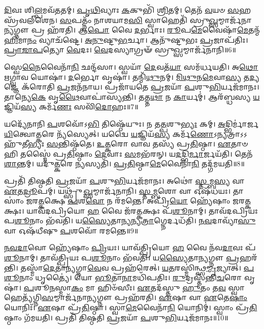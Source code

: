 \-\ul{𑌦𑌿}\-𑌵𑌃 𑌶𑌿\-\ul{𑌲𑍍𑌪}\-𑌮𑌵᳴𑌤𑌤𑌮𑍍।
\-\ul{𑌪𑍃}\-\-\ul{𑌥𑌿}\-𑌵𑍍𑌯𑌾𑌃 \ul{𑌕}\-𑌕𑍁𑌭𑌿᳴ \ul{𑌶𑍍𑌰𑌿}\-𑌤𑌮𑍍।
𑌤𑍇𑌨᳴ \ul{𑌵}\-𑌯𑍞 \ul{𑌸}\-𑌹𑌸𑍍𑌰᳴𑌵𑌲𑍍‌𑌶𑍇𑌨।
\-\ul{𑌸}\-𑌪𑌤𑍍𑌨𑌂᳴ 𑌨𑌾𑌶𑌯𑌾𑌮\-\ul{𑌸𑌿} 𑌸𑍍𑌵𑌾𑌹𑍇𑌤𑌿᳴ 𑌸𑍍𑌰𑍁\-\ul{𑌖𑍍𑌸}\-𑌮𑍍𑌮𑌾𑌰𑍍𑌜᳴𑌨𑌾\-\ul{𑌨𑍍𑌯}\-𑌗𑍍𑌨𑍗 𑌪𑍍𑌰 𑌹᳴𑌰𑌤𑌿।
𑌆\-\ul{𑌪𑍋} 𑌵𑍈 \ul{𑌦}\-𑌰𑍍𑌭𑌾𑌃।
\-\ul{𑌰𑍂}\-𑌪\-\ul{𑌮𑍇}\-𑌵𑍈𑌷𑌾᳴\-\ul{𑌮𑍇}\-𑌤𑌨𑍍𑌮᳴\-\ul{𑌹𑌿}\-𑌮𑌾\-\ul{𑌨𑌂} 𑌵𑍍𑌯𑌾𑌚᳴𑌷𑍍𑌟𑍇।
\-\ul{𑌅}\-\-\ul{𑌨𑍁}\-𑌷𑍍𑌟𑍁\-\ul{𑌭}\-𑌰𑍍𑌚𑌾।
𑌆𑌨𑍁᳴𑌷𑍍𑌟𑍁𑌭𑌃 \ul{𑌪𑍍𑌰}\-𑌜𑌾\-𑌪᳴𑌤𑌿𑌃।
\-\ul{𑌪𑍍𑌰𑌾}\-\-\ul{𑌜𑌾}\-\-\ul{𑌪}\-𑌤𑍍𑌯𑍋 \ul{𑌵𑍇}\-𑌦𑌃।
\-\ul{𑌵𑍇}\-𑌦𑌸𑍍𑌯𑌾𑌗𑍍𑌰𑍟᳴ 𑌸𑍍𑌰𑍁\-\ul{𑌖𑍍𑌸}\-𑌮𑍍𑌮𑌾𑌰𑍍𑌜᳴𑌨𑌾𑌨𑌿॥6॥

𑌸𑍍𑌵𑍇\-\ul{𑌨𑍈}\-𑌵𑍈𑌨𑌾᳴\-\ul{𑌨𑌿} 𑌛𑌨𑍍𑌦᳴𑌸𑌾।
𑌸𑍍𑌵𑌯𑌾᳴ \ul{𑌦𑍇}\-𑌵𑌤᳴\-\ul{𑌯𑌾} 𑌸𑌮᳴𑌰𑍍𑌧𑌯𑌤𑌿।
𑌅\-\ul{𑌥𑍋} 𑌋𑌗𑍍𑌵𑌾𑌵 𑌯𑍋𑌷𑌾॑।
\-\ul{𑌦}\-𑌰𑍍𑌭𑍋 𑌵𑍃𑌷𑌾॑।
𑌤𑌨𑍍𑌮𑌿᳴\-\ul{𑌥𑍁}\-𑌨𑌮𑍍।
\-\ul{𑌮𑌿}\-\-\ul{𑌥𑍁}\-𑌨\-\ul{𑌮𑍇}\-𑌵𑌾\-\ul{𑌸𑍍𑌯} 𑌤\-\ul{𑌦𑍍𑌯}\-𑌜𑍍𑌞𑍇 𑌕᳴𑌰𑍋𑌤𑌿 \ul{𑌪𑍍𑌰}\-𑌜𑌨᳴𑌨𑌾𑌯।
𑌪𑍍𑌰𑌜𑌾᳴𑌯𑌤𑍇 \ul{𑌪𑍍𑌰}\-𑌜𑌯𑌾᳴ \ul{𑌪}\-𑌶𑍁\-\ul{𑌭𑌿}\-𑌰𑍍𑌯𑌜᳴𑌮𑌾𑌨𑌃।
𑌤𑌾𑌨𑍍𑌯𑍇\-\ul{𑌕𑍇} 𑌵𑍃\-\ul{𑌥𑍈}\-𑌵𑌾𑌪𑌾॑𑌸𑍍𑌯𑌨𑍍𑌤𑌿।
𑌤𑌤𑍍𑌤\-\ul{𑌥𑌾} 𑌨 \ul{𑌕𑌾}\-𑌰𑍍𑌯𑌮𑍍॑।
𑌆𑌰᳴𑌬𑍍𑌧𑌸𑍍𑌯 \ul{𑌯}\-𑌜𑍍𑌞𑌿𑌯᳴\-\ul{𑌸𑍍𑌯} 𑌕𑌰𑍍𑌮᳴\-\ul{𑌣𑌃} 𑌸𑌵𑌿᳴\-\ul{𑌦𑍋}\-𑌹𑌃॥7॥

𑌯𑌦𑍍𑌯𑍇᳴𑌨𑌾𑌨𑌿 \ul{𑌪}\-𑌶𑌵𑍋᳴𑌽\-\ul{𑌭𑌿} 𑌤𑌿𑌷𑍍𑌠𑍇᳴𑌯𑍁𑌃।
𑌨 𑌤\-\ul{𑌤𑍍𑌪}\-𑌶𑍁\-\ul{𑌭𑍍𑌯𑌃} 𑌕𑌮𑍍।
\-\ul{𑌅}\-𑌦𑍍𑌭𑌿𑌰𑍍𑌮𑌾॑𑌰𑍍𑌜\-\ul{𑌯𑌿}\-𑌤𑍍𑌵𑍋\-\ul{𑌤𑍍𑌕}\-𑌰𑍇 𑌨𑍍𑌯᳴𑌸𑍍𑌯𑍇𑌤𑍍।
𑌯𑌦𑍍𑌵𑍈 \ul{𑌯}\-𑌜𑍍𑌞𑌿𑌯᳴\-\ul{𑌸𑍍𑌯} 𑌕𑌰𑍍𑌮᳴\-\ul{𑌣𑍋}\-\-𑌽𑌨𑍍𑌯𑌤𑍍𑌰𑌾𑌽𑌽𑌹𑍁᳴𑌤𑍀𑌭𑍍𑌯𑌃 \ul{𑌸}\-𑌨𑍍𑌤𑌿𑌷𑍍𑌠᳴𑌤𑍇।
\-\ul{𑌉}\-\-\ul{𑌤𑍍𑌕}\-𑌰𑍋 𑌵𑌾𑌵 𑌤𑌸𑍍𑌯᳴ 𑌪𑍍𑌰\-\ul{𑌤𑌿}\-𑌷𑍍𑌠𑌾।
\-\ul{𑌏}\-𑌤𑌾𑍞 𑌹𑌿 𑌤𑌸𑍍𑌮𑍈॑ 𑌪𑍍𑌰\-\ul{𑌤𑌿}\-𑌷𑍍𑌠𑌾𑌂 \ul{𑌦𑍇}\-𑌵𑌾𑌃 \ul{𑌸}\-𑌮𑌭᳴𑌰𑌨𑍍।
𑌯\-\ul{𑌦}\-𑌦𑍍𑌭𑌿\-\ul{𑌰𑍍𑌮𑌾}\-𑌰𑍍𑌜𑌯᳴𑌤𑌿।
𑌤𑍇𑌨᳴ \ul{𑌶𑌾}\-𑌨𑍍𑌤𑌮𑍍।
𑌯𑌦𑍁᳴\-\ul{𑌤𑍍𑌕}\-𑌰𑍇 \ul{𑌨𑍍𑌯}\-𑌸𑍍𑌯𑌤𑌿᳴।
\-\ul{𑌪𑍍𑌰}\-\-\ul{𑌤𑌿}\-𑌷𑍍𑌠𑌾\-\ul{𑌮𑍇}\-𑌵𑍈𑌨𑌾᳴\-\ul{𑌨𑌿} 𑌤𑌦𑍍𑌗᳴𑌮𑌯𑌤𑌿॥8॥

𑌪𑍍𑌰𑌤𑌿᳴ 𑌤𑌿𑌷𑍍𑌠𑌤𑌿 \ul{𑌪𑍍𑌰}\-𑌜𑌯𑌾᳴ \ul{𑌪}\-𑌶𑍁\-\ul{𑌭𑌿}\-𑌰𑍍𑌯𑌜᳴𑌮𑌾𑌨𑌃।
𑌅𑌥𑍋॑ \ul{𑌸𑍍𑌤}\-𑌮𑍍𑌬\-\ul{𑌸𑍍𑌯} 𑌵𑌾 \ul{𑌏}\-𑌤\-\ul{𑌦𑍍𑌰𑍂}\-𑌪𑌮𑍍।
𑌯𑌥𑍍𑌸𑍍𑌰𑍁᳴\-\ul{𑌖𑍍𑌸}\-𑌮𑍍𑌮𑌾𑌰𑍍𑌜᳴𑌨𑌾𑌨𑌿।
\-\ul{𑌸𑍍𑌤}\-\-\ul{𑌮𑍍𑌬}\-𑌶𑍋 𑌵𑌾 𑌓𑌷᳴𑌧𑌯𑌃।
𑌤𑌾𑌸𑌾𑌂॑ 𑌜𑌰\-\ul{𑌤𑍍𑌕}\-𑌕𑍍𑌷𑍇 \ul{𑌪}\-𑌶\-\ul{𑌵𑍋} 𑌨 𑌰᳴𑌮𑌨𑍍𑌤𑍇।
𑌅𑌪𑍍𑌰𑌿᳴\-\ul{𑌯𑍋} 𑌹𑍍𑌯𑍇᳴𑌷𑌾𑌂 𑌜𑌰\-\ul{𑌤𑍍𑌕}\-𑌕𑍍𑌷𑌃।
𑌯𑌾𑌵᳴𑌦𑌪𑍍𑌰𑌿𑌯𑍋 \ul{𑌹} 𑌵𑍈 𑌜᳴𑌰\-\ul{𑌤𑍍𑌕}\-𑌕𑍍𑌷𑌃 𑌪᳴\-\ul{𑌶𑍂}\-𑌨𑌾𑌮𑍍।
𑌤𑌾𑌵᳴𑌦𑌪𑍍𑌰𑌿𑌯𑌃 𑌪\-\ul{𑌶𑍂}\-𑌨𑌾𑌂 𑌭᳴𑌵𑌤𑌿।
𑌯\-\ul{𑌸𑍍𑌯𑍈}\-𑌤𑌾\-\ul{𑌨𑍍𑌯}\-𑌨𑍍𑌯\-\ul{𑌤𑍍𑌰𑌾}\-𑌗𑍍𑌨𑍇𑌰𑍍𑌦𑌧᳴𑌤𑌿।
\-\ul{𑌨}\-\-\ul{𑌵}\-𑌦𑌾𑌵𑍍𑌯𑌾᳴\-\ul{𑌸𑍁} 𑌵𑌾 𑌓𑌷᳴𑌧𑍀𑌷𑍁 \ul{𑌪}\-𑌶𑌵𑍋᳴ 𑌰𑌮𑌨𑍍𑌤𑍇॥9॥

\-\ul{𑌨}\-\-\ul{𑌵}\-\-\ul{𑌦𑌾}\-𑌵𑍋 𑌹𑍍𑌯𑍇᳴𑌷𑌾𑌂 \ul{𑌪𑍍𑌰𑌿}\-𑌯𑌃।
𑌯𑌾𑌵᳴𑌤𑍍𑌪𑍍𑌰𑌿𑌯𑍋 \ul{𑌹} 𑌵𑍈 𑌨᳴𑌵\-\ul{𑌦𑌾}\-𑌵𑌃 𑌪᳴\-\ul{𑌶𑍂}\-𑌨𑌾𑌮𑍍।
𑌤𑌾𑌵᳴𑌤𑍍𑌪𑍍𑌰𑌿𑌯𑌃 𑌪\-\ul{𑌶𑍂}\-𑌨𑌾𑌂 𑌭᳴𑌵𑌤𑌿।
𑌯\-\ul{𑌸𑍍𑌯𑍈}\-𑌤𑌾\-\ul{𑌨𑍍𑌯}\-𑌗𑍍𑌨𑍗 \ul{𑌪𑍍𑌰}\-𑌹𑌰᳴𑌨𑍍𑌤𑌿।
𑌤𑌸𑍍𑌮𑌾᳴\-\ul{𑌦𑍇}\-𑌤𑌾\-\ul{𑌨𑍍𑌯}\-𑌗𑍍𑌨𑌾\-\ul{𑌵𑍇}\-𑌵 𑌪𑍍𑌰𑌹᳴𑌰𑍇𑌤𑍍।
\-\ul{𑌯}\-\-\ul{𑌤}\-𑌰𑌸𑍍𑌮𑌿॑𑌨𑍍𑌥𑍍𑌸\-\ul{𑌮𑍍𑌮𑍃}\-𑌜𑍍𑌯𑌾𑌤𑍍।
\-\ul{𑌪}\-\-\ul{𑌶𑍂}\-𑌨𑌾𑌂 𑌧𑍃𑌤𑍍𑌯𑍈॑।
𑌯𑍋 \ul{𑌭𑍂}\-𑌤𑌾\-\ul{𑌨𑌾}\-𑌮𑌧𑌿᳴𑌪𑌤𑌿𑌃।
\-\ul{𑌰𑍁}\-𑌦𑍍𑌰𑌸𑍍𑌤᳴𑌨𑍍𑌤𑌿\-\ul{𑌚}\-𑌰𑍋 𑌵𑍃𑌷𑌾॑।
\-\ul{𑌪}\-𑌶𑍂\-\ul{𑌨}\-𑌸𑍍𑌮𑌾\-\ul{𑌕𑌂} 𑌮𑌾 𑌹𑌿𑍞᳴𑌸𑍀𑌃।
\-\ul{𑌏}\-𑌤𑌦᳴𑌸𑍍𑌤𑍁 \ul{𑌹𑍁}\-𑌤𑌂 𑌤\-\ul{𑌵} 𑌸𑍍𑌵𑌾𑌹𑍇𑌤𑍍𑌯᳴𑌗𑍍𑌨𑌿\-\ul{𑌸}\-𑌮𑍍𑌮𑌾𑌰𑍍𑌜᳴𑌨𑌾\-\ul{𑌨𑍍𑌯}\-𑌗𑍍𑌨𑍗 𑌪𑍍𑌰𑌹᳴𑌰𑌤𑌿।
\-\ul{𑌏}\-𑌷𑌾 𑌵𑌾 \ul{𑌏}\-𑌤𑍇\-\ul{𑌷𑌾𑌂} 𑌯𑍋𑌨𑌿𑌃᳴।
\-\ul{𑌏}\-𑌷𑌾 𑌪𑍍𑌰᳴\-\ul{𑌤𑌿}\-𑌷𑍍𑌠𑌾।
𑌸𑍍𑌵𑌾\-\ul{𑌮𑍇}\-𑌵𑍈𑌨𑌾᳴\-\ul{𑌨𑌿} 𑌯𑍋𑌨𑌿𑌮𑍍॑।
𑌸𑍍𑌵𑌾𑌂 𑌪𑍍𑌰᳴\-\ul{𑌤𑌿}\-𑌷𑍍𑌠𑌾𑌂 𑌗᳴𑌮𑌯𑌤𑌿।
𑌪𑍍𑌰𑌤𑌿᳴ 𑌤𑌿𑌷𑍍𑌠𑌤𑌿 \ul{𑌪𑍍𑌰}\-𑌜𑌯𑌾᳴ \ul{𑌪}\-𑌶𑍁\-\ul{𑌭𑌿}\-𑌰𑍍𑌯𑌜᳴𑌮𑌾𑌨𑌃॥10॥

